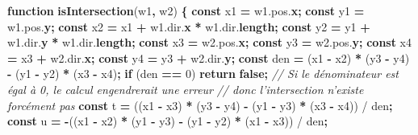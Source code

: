 \documentclass[11pt,french,a4paper,]{article}
\newenvironment{Shaded}{\begin{snugshade}}{\end{snugshade}}
\newcommand{\AttributeTok}[1]{\textcolor[rgb]{0.00,0.36,0.77}{\textbf{#1}}}
\newcommand{\CommentTok}[1]{\textcolor[rgb]{0.35,0.35,0.35}{\textit{#1}}}
\newcommand{\ControlFlowTok}[1]{\textcolor[rgb]{0.68,0.35,0.62}{\textbf{#1}}}
\newcommand{\DecValTok}[1]{\textcolor[rgb]{0.00,0.00,0.81}{#1}}
\newcommand{\KeywordTok}[1]{\textcolor[rgb]{0.68,0.35,0.62}{\textbf{#1}}}
\newcommand{\NormalTok}[1]{#1}
\newcommand{\OperatorTok}[1]{\textcolor[rgb]{0.81,0.36,0.00}{\textbf{#1}}}
\newcommand{\VariableTok}[1]{\textcolor[rgb]{0.90,0.33,0.00}{#1}}
\begin{document}
\begin{Shaded}
\begin{Highlighting}[]
\KeywordTok{function} \AttributeTok{isIntersection}\NormalTok{(w1}\OperatorTok{,}\NormalTok{ w2) }\OperatorTok{\{}
    \KeywordTok{const}\NormalTok{ x1 }\OperatorTok{=} \VariableTok{w1}\NormalTok{.}\VariableTok{pos}\NormalTok{.}\AttributeTok{x}\OperatorTok{;}
    \KeywordTok{const}\NormalTok{ y1 }\OperatorTok{=} \VariableTok{w1}\NormalTok{.}\VariableTok{pos}\NormalTok{.}\AttributeTok{y}\OperatorTok{;}
    \KeywordTok{const}\NormalTok{ x2 }\OperatorTok{=}\NormalTok{ x1 }\OperatorTok{+} \VariableTok{w1}\NormalTok{.}\VariableTok{dir}\NormalTok{.}\AttributeTok{x} \OperatorTok{*} \VariableTok{w1}\NormalTok{.}\VariableTok{dir}\NormalTok{.}\AttributeTok{length}\OperatorTok{;}
    \KeywordTok{const}\NormalTok{ y2 }\OperatorTok{=}\NormalTok{ y1 }\OperatorTok{+} \VariableTok{w1}\NormalTok{.}\VariableTok{dir}\NormalTok{.}\AttributeTok{y} \OperatorTok{*} \VariableTok{w1}\NormalTok{.}\VariableTok{dir}\NormalTok{.}\AttributeTok{length}\OperatorTok{;}
    \KeywordTok{const}\NormalTok{ x3 }\OperatorTok{=} \VariableTok{w2}\NormalTok{.}\VariableTok{pos}\NormalTok{.}\AttributeTok{x}\OperatorTok{;}
    \KeywordTok{const}\NormalTok{ y3 }\OperatorTok{=} \VariableTok{w2}\NormalTok{.}\VariableTok{pos}\NormalTok{.}\AttributeTok{y}\OperatorTok{;}
    \KeywordTok{const}\NormalTok{ x4 }\OperatorTok{=}\NormalTok{ x3 }\OperatorTok{+} \VariableTok{w2}\NormalTok{.}\VariableTok{dir}\NormalTok{.}\AttributeTok{x}\OperatorTok{;}
    \KeywordTok{const}\NormalTok{ y4 }\OperatorTok{=}\NormalTok{ y3 }\OperatorTok{+} \VariableTok{w2}\NormalTok{.}\VariableTok{dir}\NormalTok{.}\AttributeTok{y}\OperatorTok{;}
    \KeywordTok{const}\NormalTok{ den }\OperatorTok{=}\NormalTok{ (x1 }\OperatorTok{-}\NormalTok{ x2) }\OperatorTok{*}\NormalTok{ (y3 }\OperatorTok{-}\NormalTok{ y4) }\OperatorTok{-}\NormalTok{ (y1 }\OperatorTok{-}\NormalTok{ y2) }\OperatorTok{*}\NormalTok{ (x3 }\OperatorTok{-}\NormalTok{ x4)}\OperatorTok{;}
    \ControlFlowTok{if}\NormalTok{ (den }\OperatorTok{==} \DecValTok{0}\NormalTok{) }\ControlFlowTok{return} \KeywordTok{false}\OperatorTok{;}
\CommentTok{// Si le dénominateur est égal à 0, le calcul engendrerait une erreur}
\CommentTok{// donc l'intersection n'existe forcément pas}
    \KeywordTok{const}\NormalTok{ t }\OperatorTok{=}\NormalTok{ ((x1 }\OperatorTok{-}\NormalTok{ x3) }\OperatorTok{*}\NormalTok{ (y3 }\OperatorTok{-}\NormalTok{ y4) }\OperatorTok{-}\NormalTok{ (y1 }\OperatorTok{-}\NormalTok{ y3) }\OperatorTok{*}\NormalTok{ (x3 }\OperatorTok{-}\NormalTok{ x4)) / den}\OperatorTok{;}
    \KeywordTok{const}\NormalTok{ u }\OperatorTok{=} \OperatorTok{-}\NormalTok{((x1 }\OperatorTok{-}\NormalTok{ x2) }\OperatorTok{*}\NormalTok{ (y1 }\OperatorTok{-}\NormalTok{ y3) }\OperatorTok{-}\NormalTok{ (y1 }\OperatorTok{-}\NormalTok{ y2) }\OperatorTok{*}\NormalTok{ (x1 }\OperatorTok{-}\NormalTok{ x3)) / den}\OperatorTok{;}


\end{Highlighting}
\end{Shaded}
\end{document}

